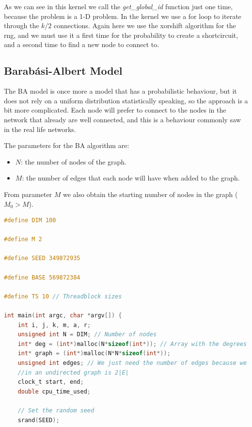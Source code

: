 \documentclass[titlepage]{article}
\begin{document}
As we can see in this kernel we call the \textit{get\_global\_id} function just one time, because the problem is a 1-D problem. In the kernel we use a for loop to iterate through the $k/2$ connections. Again here we use the xorshift algorithm for the rng, and we must use it a first time for the probability to create a shortcircuit, and a second time to find a new node to connect to.

\subsection{Barabási-Albert Model}
The BA model is once more a model that has a probabilistic behaviour, but it does not rely on a uniform distribution statistically speaking, so the approach is a bit more complicated. Each node will prefer to connect to the nodes in the network that already are well connected, and this is a behaviour commonly saw in the real life networks.

The parameters for the BA algorithm are:
\begin{itemize}
    \item $N$: the number of nodes of the graph.
    \item $M$: the number of edges that each node will have when added to the graph.
\end{itemize}

From parameter $M$ we also obtain the starting number of nodes in the graph ($M_0>M$).

\begin{minipage}{\linewidth}
\begin{lstlisting}[language=C, style=customc, breaklines=true]
#define DIM 100

#define M 2

#define SEED 349872935

#define BASE 569872384

#define TS 10 // Threadblock sizes

int main(int argc, char *argv[]) {
    int i, j, k, m, a, r;
    unsigned int N = DIM; // Number of nodes
    int* deg = (int*)malloc(N*sizeof(int*)); // Array with the degrees of the nodes
    int* graph = (int*)malloc(N*N*sizeof(int*));
    unsigned int edges; // We just need the number of edges because we know that the sum of the degrees
    //in an undirected graph is 2|E|
    clock_t start, end;
    double cpu_time_used;

    // Set the random seed
    srand(SEED);
\end{lstlisting}
\end{minipage}
\end{document}
